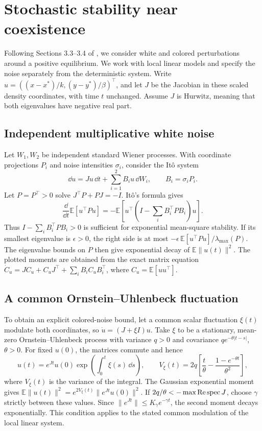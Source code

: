 \section{Stochastic stability near coexistence}\label{sec:noise}
Following Sections 3.3--3.4 of \citet{haque11}, we consider white and colored perturbations around a positive equilibrium. We work with local linear models and specify the noise separately from the deterministic system. Write \(u=((x-x^*)/k,(y-y^*)/\beta)^\top\), and let \(J\) be the Jacobian in these scaled density coordinates, with time \(t\) unchanged. Assume \(J\) is Hurwitz, meaning that both eigenvalues have negative real part.

\subsection{Independent multiplicative white noise}
Let \(W_1,W_2\) be independent standard Wiener processes. With coordinate projections \(P_i\) and noise intensities \(\sigma_i\), consider the It\^o system
\[
 \dd u=Ju\,\dd t+\sum_{i=1}^2 B_i u\,\dd W_i,\qquad B_i=\sigma_iP_i.
\]
Let \(P=P^\top>0\) solve \(J^\top P+PJ=-I\). It\^o's formula gives
\[
 \frac{\dd}{\dd t}\mathbb E[u^\top Pu]
 =-\mathbb E\!\left[u^\top
       \left(I-\textstyle\sum_i B_i^\top PB_i\right)u\right].
\]
Thus \(I-\sum_i B_i^\top PB_i>0\) is sufficient for exponential mean-square stability. If its smallest eigenvalue is \(\epsilon>0\), the right side is at most \(-\epsilon\,\mathbb E[u^\top Pu]/\lambda_{\max}(P)\). The eigenvalue bounds on \(P\) then give exponential decay of \(\mathbb E\|u(t)\|^2\). The plotted moments are obtained from the exact matrix equation \(\dot C_u=JC_u+C_uJ^\top+\sum_iB_iC_uB_i^\top\), where \(C_u=\mathbb E[uu^\top]\).

\subsection{A common Ornstein--Uhlenbeck fluctuation}
To obtain an explicit colored-noise bound, let a common scalar fluctuation \(\xi(t)\) modulate both coordinates, so \(\dot u=(J+\xi I)u\). Take \(\xi\) to be a stationary, mean-zero Ornstein--Uhlenbeck process with variance \(q>0\) and covariance \(q e^{-\theta |t-s|}\), \(\theta>0\). For fixed \(u(0)\), the matrices commute and hence
\[
 u(t)=e^{Jt}u(0)\exp\!\left(\int_0^t \xi(s)\,\dd s\right),\qquad
 V_\xi(t)=2q\left[\frac{t}{\theta}-\frac{1-e^{-\theta t}}{\theta^2}\right],
\]
where \(V_\xi(t)\) is the variance of the integral. The Gaussian exponential moment gives \(\mathbb E\|u(t)\|^2=e^{2V_\xi(t)}\|e^{Jt}u(0)\|^2\). If \(2q/\theta<-\max\operatorname{Re}\operatorname{spec} J\), choose \(\gamma\) strictly between these values. Since \(\|e^{Jt}\|\le K_\gamma e^{-\gamma t}\), the second moment decays exponentially. This condition applies to the stated common modulation of the local linear system.

